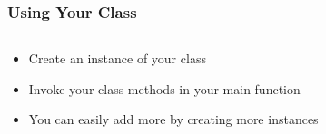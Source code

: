\begin{frame}
	\frametitle{Using Your Class}
	\begin{columns}[T]
		\begin{column}{0.5\textwidth}
			\begin{itemize}
				\item Create an instance of your class
				\item Invoke your class methods in your main function
				\item You can easily add more by creating more instances
			\end{itemize}
		\end{column}
		\begin{column}{0.5\textwidth}
					
		\end{column}
	\end{columns}
\end{frame}